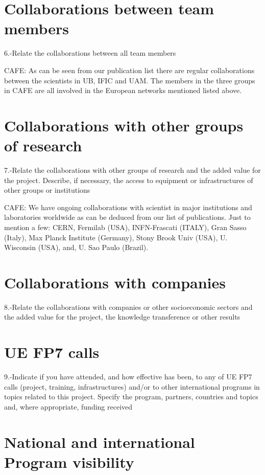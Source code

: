 \documentclass[a4paper,11pt,oneside]{article}
\begin{document}
\section{\bf \textsf{Collaborations between team members}}
6.-Relate the collaborations between all team members 


CAFE: As can be seen from our publication list there are regular
collaborations between the scientists in UB, IFIC and UAM. 
The members in the three groups in CAFE are all involved in the European
networks mentioned listed above. 


\section{\bf \textsf{Collaborations with other groups of research}}

7.-Relate the collaborations with other groups of research and the added value for the project. Describe, if necessary, the access to equipment or infrastructures of other groups or institutions

CAFE: We have ongoing collaborations with scientist in major institutions
and laboratories worldwide as can be deduced from our list
of publications. Just to mention a few: CERN, Fermilab (USA), 
INFN-Frascati (ITALY), Gran Sasso (Italy), Max Planck Institute (Germany),
Stony Brook Univ (USA), U. Wisconsin (USA), and, U. Sao Paulo (Brazil). 

\section{\bf \textsf{Collaborations with companies}}

8.-Relate the collaborations with companies or other socioeconomic sectors and the added value for the project, the knowledge transference or other results

\section{\bf \textsf{UE FP7 calls}}

9.-Indicate if you have attended, and how effective has been, to any of UE FP7 calls (project, training, infrastructures) and/or to other international programs in topics related to this project. Specify the program, partners, countries and topics and, where appropriate, funding received

\section{\bf \textsf{National and international Program visibility}}
\end{document}
